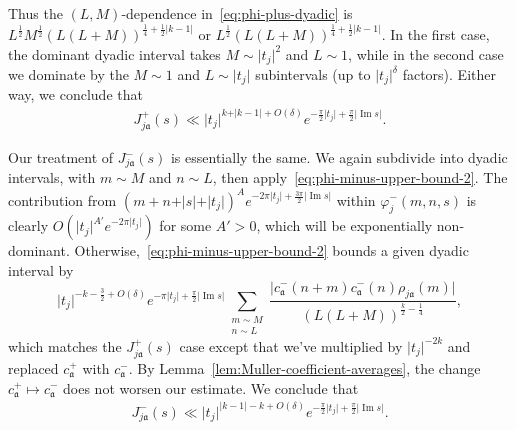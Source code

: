 \documentclass[11pt,reqno]{amsart}
\theoremstyle{plain}
\theoremstyle{definition}
\numberwithin{equation}{section}
\renewcommand{\Im}{\operatorname{Im}}
\begin{document}
Thus the $(L,M)$-dependence in~\eqref{eq:phi-plus-dyadic} is $L^\frac{1}{2} M^\frac{1}{2} (L(L+M))^{\frac{1}{4}+\frac{1}{2}\vert k-1 \vert}$ or $L^{\frac{1}{2}} (L(L+M))^{\frac{1}{4}+\frac{1}{2}\vert k-1 \vert}$.
In the first case, the dominant dyadic interval takes $M \sim \vert t_j \vert^2$ and $L \sim 1$, while in the second case we dominate by the $M \sim 1$ and $L \sim \vert t_j \vert$ subintervals (up to $\vert t_j \vert^\delta$ factors). Either way, we conclude that
\begin{align} \label{eq:J-plus-upper-bound}
	J_{j\mathfrak{a}}^+(s) \ll  
		\vert t_j \vert^{k + \vert k-1 \vert + O(\delta)}
		e^{-\frac{\pi}{2} \vert  t_j \vert + \frac{\pi}{2} \vert \Im s \vert}.
\end{align}

Our treatment of $J_{j\mathfrak{a}}^-(s)$ is essentially the same. We again subdivide into dyadic intervals, with $m \sim M$ and $n \sim L$, then apply~\eqref{eq:phi-minus-upper-bound-2}. The contribution from $(m+n+ \vert s \vert + \vert t_j \vert)^A e^{-2\pi \vert t_j \vert + \frac{3\pi}{2} \vert \Im s \vert}$ within $\varphi_j^-(m,n,s)$ is clearly $O( \vert t_j \vert^{A'} e^{-2\pi \vert t_j \vert})$ for some $A' > 0$, which will be exponentially non-dominant. Otherwise,~\eqref{eq:phi-minus-upper-bound-2} bounds a given dyadic interval by
\[
	\vert t_j \vert^{- k - \frac{3}{2} + O(\delta)} 
		e^{-\pi \vert t_j \vert + \frac{\pi}{2} \vert \Im s \vert}
		\sum_{\substack{m \sim M \\ n \sim L}} 
		\frac{\vert c_\mathfrak{a}^-(n+m) c_\mathfrak{a}^-(n) \rho_{j\mathfrak{a}}(m) \vert}
			{(L(L+M))^{\frac{k}{2}-\frac{1}{4}}},
\]
which matches the $J_{j\mathfrak{a}}^+(s)$ case except that we've multiplied by $\vert t_j \vert^{-2k}$ and replaced $c_\mathfrak{a}^+$ with $c_\mathfrak{a}^-$. By Lemma~\ref{lem:Muller-coefficient-averages}, the change $c_\mathfrak{a}^+ \mapsto c_\mathfrak{a}^-$ does not worsen our estimate. We conclude that
\begin{align} \label{eq:J-minus-upper-bound}
	J_{j\mathfrak{a}}^-(s) \ll 
		\vert t_j \vert^{\vert k-1 \vert-k + O(\delta)}
		e^{-\frac{\pi}{2} \vert  t_j \vert + \frac{\pi}{2} \vert \Im s \vert} .
\end{align}
\end{document}
